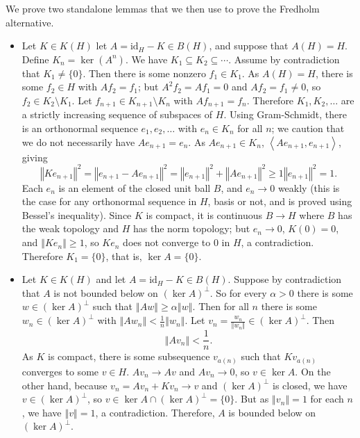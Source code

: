 \documentclass{article}
\newcommand{\inner}[2]{\left\langle #1, #2 \right\rangle}
\newcommand{\id}{\textrm{id}}
\newcommand{\norm}[1]{\left\Vert #1 \right\Vert}
\begin{document}
We prove two standalone lemmas that we then use to prove the Fredholm alternative.
\begin{itemize}
\item  Let $K \in K(H)$ let $A=\id_H - K \in B(H)$,
and suppose that $A(H) = H$. Define $K_n=\ker(A^n)$. We have $K_1 \subseteq K_2 \subseteq \cdots$. Assume by contradiction that $K_1 \neq \{0\}$.  Then there is some nonzero $f_1 \in K_1$.
As $A(H) = H$, there is some $f_2 \in H$ with $Af_2=f_1$; but $A^2 f_2=Af_1=0$ and $Af_2=f_1 \neq 0$, so $f_2 \in K_2 \setminus K_1$. Let $f_{n+1} \in K_{n+1} \setminus 
K_n$ with $Af_{n+1}=f_n$. Therefore $K_1, K_2, \ldots$ are a strictly increasing sequence of subspaces of $H$. Using Gram-Schmidt, there is an orthonormal
sequence $e_1,e_2,\ldots$ with $e_n \in K_n$ for all $n$; we caution that we do not necessarily
have $Ae_{n+1}=e_n$. As $Ae_{n+1} \in K_n$, $\inner{Ae_{n+1}}{e_{n+1}}$, giving 
\[
\norm{Ke_{n+1}}^2=\norm{e_{n+1}-Ae_{n+1}}^2=\norm{e_{n+1}}^2+\norm{Ae_{n+1}}^2 \geq 1\norm{e_{n+1}}^2=1.
\]
Each $e_n$ is an element of the closed unit ball $B$, and $e_n \to 0$ weakly (this is the case for any orthonormal sequence in $H$, basis or not, and is proved using Bessel's inequality). 
Since $K$ is compact, it is continuous $B \to H$ where $B$ has the weak topology and $H$ has the norm topology; but $e_n \to 0$, $K(0)=0$,
and $\norm{Ke_n} \geq 1$, so $Ke_n$ does not converge to $0$ in $H$, a contradiction. Therefore $K_1 = \{0\}$, that is, $\ker A=\{0\}$.

\item Let $K \in K(H)$ and let $A=\id_H - K \in B(H)$.  Suppose by contradiction that $A$ is not bounded below on
$(\ker A)^\perp$. So for every $\alpha>0$ there is some $w \in (\ker A)^\perp$ such that $\norm{Aw} \geq \alpha \norm{w}$. Then for
all $n$ there is some $w_n \in (\ker A)^\perp$ with $\norm{Aw_n} < \frac{1}{n} \norm{w_n}$. Let $v_n = \frac{w_n}{\norm{w_n}} \in (\ker A)^\perp$. Then
\[
\norm{Av_n} < \frac{1}{n}.
\]
As $K$ is compact, there is
some subsequence $v_{a(n)}$ such that $Kv_{a(n)}$ converges to some
$v \in H$. 
$Av_n \to Av$ and $Av_n \to 0$, so $v \in \ker A$.
On the other hand,
because $v_n=Av_n+Kv_n \to v$ and $(\ker A)^\perp$ is closed, we have $v \in (\ker A)^\perp$, so
$v \in \ker A \cap (\ker A)^\perp = \{0\}$.
But as $\norm{v_n}=1$ for each $n$, we have $\norm{v}=1$, a contradiction.
Therefore, $A$ is bounded below on $(\ker A)^\perp$.
\end{itemize}
\end{document}
